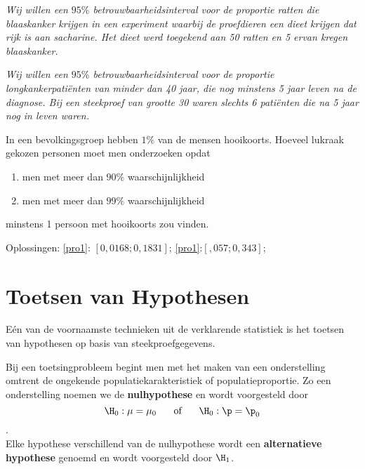 {{\footnotesize
\begin{Opgave}\label{pro1}
\em Wij willen een $95\%$ betrouwbaarheidsinterval voor de proportie ratten die blaaskanker krijgen in een experiment waarbij de proefdieren een dieet krijgen dat rijk is aan sacharine. Het dieet werd toegekend aan 50 ratten en 5 ervan kregen blaaskanker.
\end{Opgave}
\begin{opgave}\label{pro2}
\em Wij willen een $95\%$ betrouwbaarheidsinterval voor de proportie longkankerpati\"enten van minder dan 40\; jaar, die nog minstens 5\; jaar leven na de diagnose. Bij een steekproef van grootte 30 waren slechts 6 pati\"enten die na 5\; jaar nog in leven waren.
\end{opgave}
\begin{opgave}\label{prow3}
In een bevolkingsgroep hebben $1\%$ van de mensen hooikoorts. Hoeveel lukraak gekozen personen moet men onderzoeken opdat
\begin{enumerate}
 \item men met meer dan $90\%$ waarschijnlijkheid
\item men met meer dan $99\%$ waarschijnlijkheid
\end{enumerate}
minstens 1 persoon met hooikoorts zou vinden. 
\end{opgave}
{\sc Oplossingen:}
\ref{pro1}:\; $[0,0168; 0,1831]$; \;\ref{pro1}:\;$[,057;0,343]$; \; %

}
\section{Toetsen van Hypothesen}
E\'en van de voornaamste technieken uit de verklarende statistiek is het 
toetsen van hypothesen op basis van 
steekproefgegevens.

Bij een toetsingprobleem begint men met het maken van een onderstelling omtrent de ongekende populatiekarakteristiek of populatieproportie. Zo een onderstelling noemen we de \textbf{nulhypothese} en wordt voorgesteld door $$\H_0: \mu=\mu_0\hspace{0,5cm}\mbox{ of }\hspace{0,5cm}\H_0:\p=\p_0$$.\\ Elke hypothese verschillend van de nulhypothese wordt  een {\bf  alternatieve hypothese} genoemd en wordt voorgesteld door $\H_1$.

}
